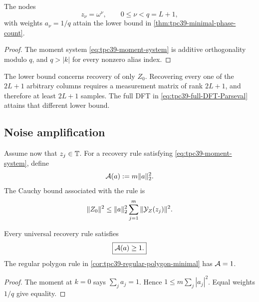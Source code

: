 \begin{corollary}
\label{cor:tpc39-regular-polygon-minimal}
The nodes
\begin{equation}
 z_\nu=\omega^\nu,
 \qquad0\le\nu<q=L+1,
 \label{eq:tpc39-regular-polygon-nodes}
\end{equation}
with weights \(a_\nu=1/q\) attain the lower bound in
\cref{thm:tpc39-minimal-phase-count}.
\end{corollary}

\begin{proof}
The moment system \eqref{eq:tpc39-moment-system} is additive
orthogonality modulo \(q\), and \(q>|k|\) for every nonzero alias index.
\end{proof}

The lower bound concerns recovery of only \(Z_0\).  Recovering every one
of the \(2L+1\) arbitrary columns requires a measurement matrix of rank
\(2L+1\), and therefore at least \(2L+1\) samples.  The full DFT in
\eqref{eq:tpc39-full-DFT-Parseval} attains that different lower bound.

\subsection{Noise amplification}

Assume now that \(z_j\in\mathbb T\).  For a recovery rule satisfying
\eqref{eq:tpc39-moment-system}, define
\begin{equation}
 \mathcal A(a):=m\|a\|_2^2.
 \label{eq:tpc39-noise-amplification}
\end{equation}
The Cauchy bound associated with the rule is
\begin{equation}
 \|Z_0\|^2
 \le\|a\|_2^2\sum_{j=1}^{m}\|\mathcal Y_Z(z_j)\|^2.
 \label{eq:tpc39-general-recovery-Cauchy}
\end{equation}

\begin{proposition}
\label{prop:tpc39-optimal-conditioning}
Every universal recovery rule satisfies
\begin{equation}
 \boxed{\mathcal A(a)\ge1.}
 \label{eq:tpc39-amplification-lower-bound}
\end{equation}
The regular polygon rule in
\cref{cor:tpc39-regular-polygon-minimal} has \(\mathcal A=1\).
\end{proposition}

\begin{proof}
The moment at \(k=0\) says \(\sum_ja_j=1\).  Hence
\(1\le m\sum_j|a_j|^2\).  Equal weights \(1/q\) give equality.
\end{proof}

